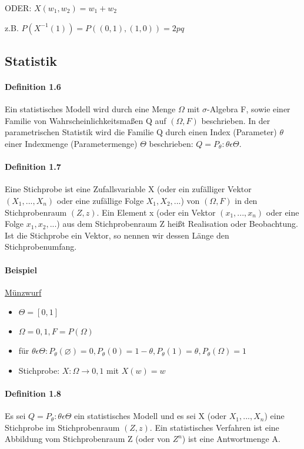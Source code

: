 \documentclass[paper=a4, fontsize=11pt]{scrartcl}
\numberwithin{equation}{section}
\numberwithin{figure}{section}
\numberwithin{table}{section}
\begin{document}
ODER: $X(w_{1},w_{2})=w_{1}+w_{2}$

z.B. $P(X^{-1}({1})) = P({(0,1),(1,0)})= 2pq$

\subsection{Statistik}
\paragraph{Definition 1.6}
Ein statistisches Modell wird durch eine Menge $\Omega$ mit $\sigma$-Algebra F, sowie einer Familie von Wahrscheinlichkeitsmaßen Q auf $( \Omega, F)$ beschrieben. In der parametrischen Statistik wird die Familie Q durch einen Index (Parameter) $\theta$ einer Indexmenge (Parametermenge) $\Theta$ beschrieben: $Q = {P_{\theta} : \theta \epsilon \Theta}$.

\paragraph{Definition 1.7}
Eine Stichprobe ist eine Zufallsvariable X (oder ein zufälliger Vektor $(X_{1}, ..., X_{n})$ oder eine zufällige Folge $X_{1}, X_{2}, ...$) von $( \Omega, F)$ in den Stichprobenraum $(Z,z)$. Ein Element x (oder ein Vektor $(x_{1}, ..., x_{n})$ oder eine Folge $x_{1}, x_{2}, ...$) aus dem Stichprobenraum Z heißt Realisation oder Beobachtung. Ist die Stichprobe ein Vektor, so nennen wir dessen Länge den Stichprobenumfang.

\paragraph{Beispiel}
\underline{Münzwurf}
\begin{itemize}
\item $\Theta = [0,1]$
\item $\Omega = {0,1}, F = P(\Omega)$
\item für $\theta \epsilon \Theta: P_{\theta} (\varnothing) = 0, P_{\theta}({0}) = 1- \theta, P_{\theta}({1}) = \theta, P_{\theta}(\Omega) = 1$
\item Stichprobe: $X: \Omega \rightarrow {0,1}$ mit $X(w) = w$
\end{itemize}

\paragraph{Definition 1.8}
Es sei $Q = {P_{\theta} : \theta \epsilon \Theta}$ ein statistisches Modell und es sei X (oder $X_{1}, ..., X_{n}$) eine Stichprobe im Stichprobenraum $(Z,z)$. Ein statistisches Verfahren ist eine Abbildung vom Stichprobenraum Z (oder von $Z^{n}$) ist eine Antwortmenge A.
\end{document}
